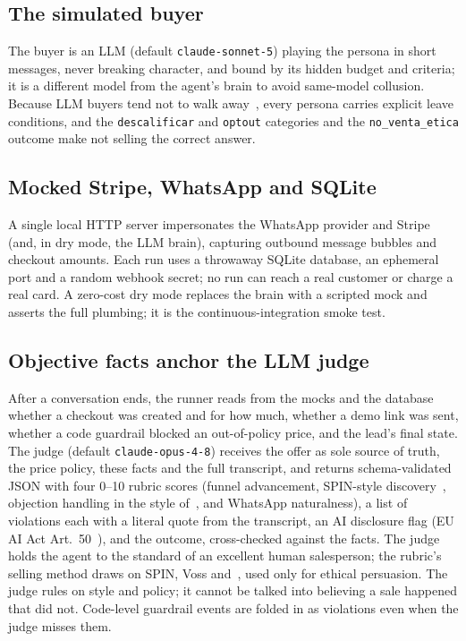 \documentclass[11pt]{article}
\newcommand{\code}[1]{\texttt{#1}}
\begin{document}
\subsection{The simulated buyer}
The buyer is an LLM (default \code{claude-sonnet-5}) playing the persona in short messages, never
breaking character, and bound by its hidden budget and criteria; it is a different model from the
agent's brain to avoid same-model collusion.
Because LLM buyers tend not to walk away~\citep{simcustomers2026,salessim2026}, every persona carries
explicit leave conditions, and the \code{descalificar} and \code{optout} categories and the
\code{no\_venta\_etica} outcome make not selling the correct answer.

\subsection{Mocked Stripe, WhatsApp and SQLite}
A single local HTTP server impersonates the WhatsApp provider and Stripe (and, in dry mode, the LLM
brain), capturing outbound message bubbles and checkout amounts. Each run uses a throwaway SQLite
database, an ephemeral port and a random webhook secret; no run can reach a real customer or charge a
real card.
A zero-cost dry mode replaces the brain with a scripted mock and asserts the full plumbing; it is the
continuous-integration smoke test.

\subsection{Objective facts anchor the LLM judge}
After a conversation ends, the runner reads from the mocks and the database whether a checkout was
created and for how much, whether a demo link was sent, whether a code guardrail blocked an
out-of-policy price, and the lead's final state. The judge (default \code{claude-opus-4-8}) receives the
offer as sole source of truth, the price policy, these facts and the full transcript, and returns
schema-validated JSON with four 0--10 rubric scores (funnel advancement, SPIN-style
discovery~\citep{rackham1988spin}, objection handling in the style of~\citet{voss2016never}, and
WhatsApp naturalness), a list of violations each with a literal quote from the transcript, an AI
disclosure flag (EU AI Act Art.~50~\citep{euaiact2024}), and the outcome, cross-checked against the
facts.
The judge holds the agent to the standard of an excellent human salesperson; the rubric's selling
method draws on SPIN, Voss and~\citet{cialdini1984influence}, used only for ethical persuasion.
The judge rules on style and policy; it cannot be talked into believing a sale happened that did not.
Code-level guardrail events are folded in as violations even when the judge misses them.
\end{document}
